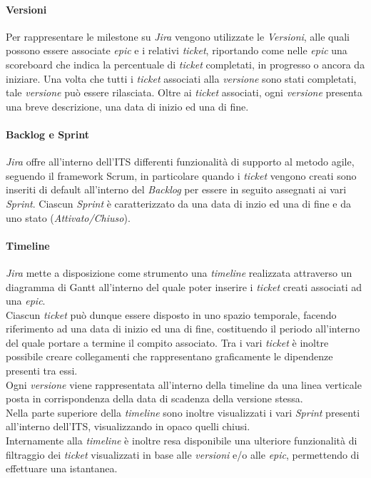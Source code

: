\documentclass[10pt, a4paper]{article}
\begin{document}
\paragraph{Versioni}
Per rappresentare le milestone su \textit{Jira} vengono utilizzate le \textit{Versioni}, alle quali possono essere associate \textit{epic}
e i relativi \textit{ticket}, riportando come nelle \textit{epic} una scoreboard che indica la percentuale di \textit{ticket} completati, in progresso o ancora da iniziare.
Una volta che tutti i \textit{ticket} associati alla \textit{versione} sono stati completati, tale \textit{versione} può essere rilasciata.
Oltre ai \textit{ticket} associati, ogni \textit{versione} presenta una breve descrizione, una data di inizio ed una di fine.

\paragraph{Backlog e Sprint}
\textit{Jira} offre all'interno dell'ITS differenti funzionalità di supporto al metodo agile, seguendo il framework Scrum, in particolare
quando i \textit{ticket} vengono creati sono inseriti di default all'interno del \textit{Backlog} per essere in seguito
assegnati ai vari \textit{Sprint}. 
Ciascun \textit{Sprint} è caratterizzato da una data di inzio ed una di fine e da uno stato (\textit{Attivato/Chiuso}).

\paragraph{Timeline}
\textit{Jira} mette a disposizione come strumento una \textit{timeline} realizzata attraverso un diagramma di Gantt all'interno del quale poter inserire i \textit{ticket}
creati associati ad una \textit{epic}.\\
Ciascun \textit{ticket} può dunque essere disposto in uno spazio temporale, facendo riferimento ad una data di inizio ed una di fine, costituendo il periodo
all'interno del quale portare a termine il compito associato. Tra i vari \textit{ticket} è inoltre possibile creare collegamenti che rappresentano graficamente 
le dipendenze presenti tra essi.\\
Ogni \textit{versione} viene rappresentata all'interno della timeline da una linea verticale posta in corrispondenza della data di scadenza
della versione stessa.\\
Nella parte superiore della \textit{timeline} sono inoltre visualizzati i vari \textit{Sprint} presenti all'interno dell'ITS, visualizzando in opaco quelli chiusi.\\
Internamente alla \textit{timeline} è inoltre resa disponibile una ulteriore funzionalità di filtraggio dei \textit{ticket} visualizzati in base alle \textit{versioni} e/o alle \textit{epic},
permettendo di effettuare una istantanea.
\end{document}
